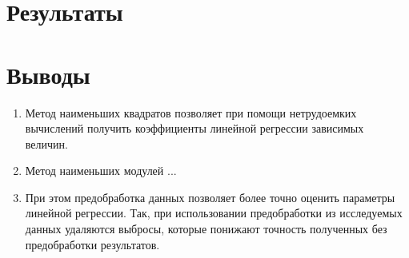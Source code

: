 \documentclass[12pt]{article}
\begin{document}
\section{Результаты}


\section{Выводы}
\begin{enumerate}
    \item Метод наименьших квадратов позволяет при помощи нетрудоемких вычислений получить коэффициенты линейной регрессии зависимых величин.
    \item Метод наименьших модулей ...
    \item При этом предобработка данных позволяет более точно оценить параметры линейной регрессии. Так, при использовании предобработки из исследуемых данных удаляются выбросы, которые понижают точность полученных без предобработки результатов.
\end{enumerate}
\newpage
\end{document}
